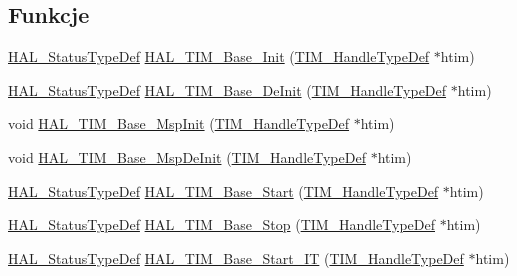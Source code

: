 \subsection*{Funkcje}
\begin{DoxyCompactItemize}
\item 
\hyperlink{stm32f4xx__hal__def_8h_a63c0679d1cb8b8c684fbb0632743478f}{H\+A\+L\+\_\+\+Status\+Type\+Def} \hyperlink{group___t_i_m___exported___functions___group1_ga1b288eb68eb52c97b8d187cdd6e9088f}{H\+A\+L\+\_\+\+T\+I\+M\+\_\+\+Base\+\_\+\+Init} (\hyperlink{struct_t_i_m___handle_type_def}{T\+I\+M\+\_\+\+Handle\+Type\+Def} $\ast$htim)
\item 
\hyperlink{stm32f4xx__hal__def_8h_a63c0679d1cb8b8c684fbb0632743478f}{H\+A\+L\+\_\+\+Status\+Type\+Def} \hyperlink{group___t_i_m___exported___functions___group1_gaaf97adbc39e48456a1c83c54895de83b}{H\+A\+L\+\_\+\+T\+I\+M\+\_\+\+Base\+\_\+\+De\+Init} (\hyperlink{struct_t_i_m___handle_type_def}{T\+I\+M\+\_\+\+Handle\+Type\+Def} $\ast$htim)
\item 
void \hyperlink{group___t_i_m___exported___functions___group1_ga818f4d5d1e2f417438d281b4ac9efb9c}{H\+A\+L\+\_\+\+T\+I\+M\+\_\+\+Base\+\_\+\+Msp\+Init} (\hyperlink{struct_t_i_m___handle_type_def}{T\+I\+M\+\_\+\+Handle\+Type\+Def} $\ast$htim)
\item 
void \hyperlink{group___t_i_m___exported___functions___group1_ga13352a6c9cb3225511e5f29dbb894e84}{H\+A\+L\+\_\+\+T\+I\+M\+\_\+\+Base\+\_\+\+Msp\+De\+Init} (\hyperlink{struct_t_i_m___handle_type_def}{T\+I\+M\+\_\+\+Handle\+Type\+Def} $\ast$htim)
\item 
\hyperlink{stm32f4xx__hal__def_8h_a63c0679d1cb8b8c684fbb0632743478f}{H\+A\+L\+\_\+\+Status\+Type\+Def} \hyperlink{group___t_i_m___exported___functions___group1_gaf7e5ee80207a338050413e14f7bd24f9}{H\+A\+L\+\_\+\+T\+I\+M\+\_\+\+Base\+\_\+\+Start} (\hyperlink{struct_t_i_m___handle_type_def}{T\+I\+M\+\_\+\+Handle\+Type\+Def} $\ast$htim)
\item 
\hyperlink{stm32f4xx__hal__def_8h_a63c0679d1cb8b8c684fbb0632743478f}{H\+A\+L\+\_\+\+Status\+Type\+Def} \hyperlink{group___t_i_m___exported___functions___group1_ga78697261126cd2facc463b81e8c4b238}{H\+A\+L\+\_\+\+T\+I\+M\+\_\+\+Base\+\_\+\+Stop} (\hyperlink{struct_t_i_m___handle_type_def}{T\+I\+M\+\_\+\+Handle\+Type\+Def} $\ast$htim)
\item 
\hyperlink{stm32f4xx__hal__def_8h_a63c0679d1cb8b8c684fbb0632743478f}{H\+A\+L\+\_\+\+Status\+Type\+Def} \hyperlink{group___t_i_m___exported___functions___group1_gae517d80e2ac713069767df8e8915971e}{H\+A\+L\+\_\+\+T\+I\+M\+\_\+\+Base\+\_\+\+Start\+\_\+\+IT} (\hyperlink{struct_t_i_m___handle_type_def}{T\+I\+M\+\_\+\+Handle\+Type\+Def} $\ast$htim)

\end{DoxyCompactItemize}
